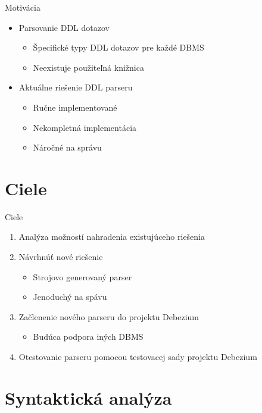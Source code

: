 \documentclass{beamer}
\begin{document}
\begin{frame}{Motivácia}

\begin{itemize}
  \item<1-> Parsovanie DDL dotazov
  \begin{itemize}
    \item<1-> Špecifické typy DDL dotazov pre každé DBMS
    \item<1-> Neexistuje použiteľná knižnica
  \end{itemize}
  \item<2-> Aktuálne riešenie DDL parseru
  \begin{itemize}
    \item<2-> Ručne implementované
    \item<2-> \alert{Nekompletná implementácia}
    \item<2-> \alert{Náročné na správu}
  \end{itemize}
\end{itemize}

\end{frame}

\section{Ciele}

\begin{frame}{Ciele}

\begin{enumerate}
  \item Analýza možností nahradenia existujúceho riešenia
  \item Návrhnúť nové riešenie
  \begin{itemize}
    \item Strojovo generovaný parser
    \item Jenoduchý na spávu
  \end{itemize}
  \item Začlenenie nového parseru do projektu Debezium
  \begin{itemize}
    \item Budúca podpora iných DBMS
  \end{itemize}
  \item Otestovanie parseru pomocou testovacej sady projektu Debezium
\end{enumerate}

\end{frame}

\section{Syntaktická analýza}
\end{document}
